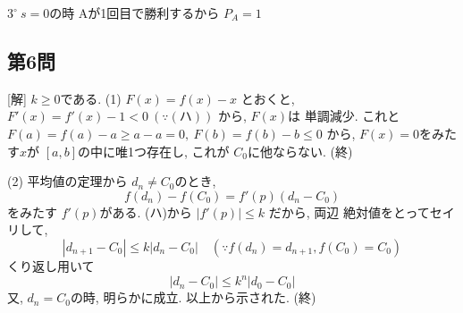\documentclass[../main.tex]{subfiles}
\begin{document}
$3^\circ \ s=0$の時
Aが1回目で勝利するから $P_A = 1$

\subsection*{第6問}
[解] $k \ge 0$である.
(1) $F(x) = f(x) - x$ とおくと, $F'(x) = f'(x) - 1 < 0 \ (\because (\text{ハ}))$ から, $F(x)$は
単調減少. これと $F(a) = f(a) - a \ge a - a = 0, \ F(b) = f(b) - b \le 0$
から, $F(x) = 0$をみたす$x$が $[a,b]$の中に唯1つ存在し, これが
$C_0$に他ならない. (終)

(2) 平均値の定理から $d_n \neq C_0$のとき,
$$ f(d_n) - f(C_0) = f'(p) (d_n - C_0) $$
をみたす $f'(p)$がある. (ハ)から $|f'(p)| \le k$ だから, 両辺
絶対値をとってセイリして,
$$ |d_{n+1} - C_0| \le k |d_n - C_0| \quad (\because f(d_n) = d_{n+1}, f(C_0) = C_0) $$
くり返し用いて
$$ |d_n - C_0| \le k^n |d_0 - C_0| $$
又, $d_n = C_0$の時, 明らかに成立.
以上から示された. (終)
\end{document}

